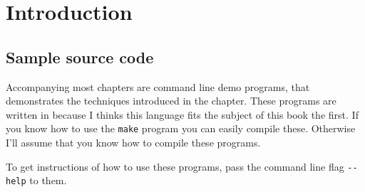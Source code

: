 
\chapter{Introduction}

\section{Sample source code}

Accompanying most chapters are command line demo programs, that demonstrates the
techniques introduced in the chapter. These programs are written in \C
because I thinks this language fits the subject of this book the
first. If you know how to use the \verb|make| program you can easily
compile these. Otherwise I'll assume that you know how to compile
these programs.

To get instructions of how to use these programs, pass the command
line flag \verb|--help| to them.
